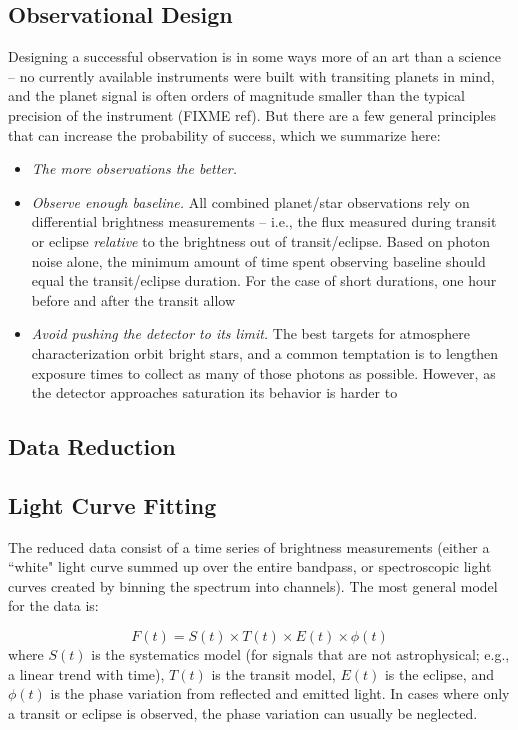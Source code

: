 \documentclass[graybox,natbib,nosecnum]{svmult}
\begin{document}
\subsection{Observational Design}
Designing a successful observation is in some ways more of an art than a science -- no currently available instruments were built with transiting planets in mind, and the planet signal is often orders of magnitude smaller than the typical precision of the instrument (FIXME ref).  But there are a few general principles that can increase the probability of success, which we summarize here:

\begin{itemize}
\item{\emph{The more observations the better.}}
\item{\emph{Observe enough baseline.} All combined planet/star observations rely on differential brightness measurements -- i.e., the flux measured during transit or eclipse \emph{relative} to the brightness out of transit/eclipse. Based on photon noise alone, the minimum amount of time spent observing baseline should equal the transit/eclipse duration. For the case of short durations, one hour before and after the transit  allow }
\item{\emph{Avoid pushing the detector to its limit.} The best targets for atmosphere characterization orbit bright stars, and a common temptation is to lengthen exposure times to collect as many of those photons as possible. However, as the detector approaches saturation its behavior is harder to  }
\end{itemize}

\subsection{Data Reduction}

\subsection{Light Curve Fitting}
The reduced data consist of a time series of brightness measurements (either a ``white" light curve summed up over the entire bandpass, or spectroscopic light curves created by binning the spectrum into channels).  The most general model for the data is:

\begin{equation}
F(t) = S(t) \times T(t) \times E(t) \times \phi(t)
\end{equation}
where $S(t)$ is the systematics model (for signals that are not astrophysical; e.g., a linear trend with time), $T(t)$ is the transit model, $E(t)$ is the eclipse, and $\phi(t)$ is the phase variation from reflected and emitted light. In cases where only a transit or eclipse is observed, the phase variation can usually be neglected.
\end{document}
